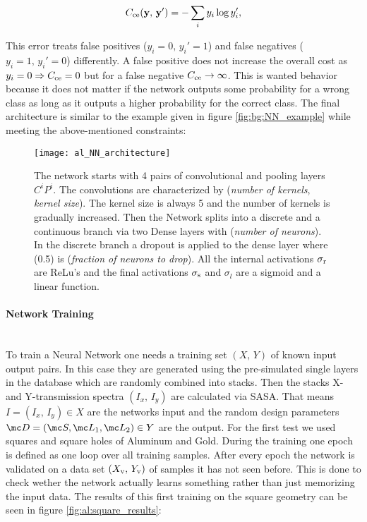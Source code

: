 \begin{equation}
    C_{\mathrm{ce}}(\vb y, \, \vb y') = - \sum_i y_i \log y'_i,
\end{equation}

\noindent
This error treats false positives ($y_i = 0, \, y_i' = 1$) and false negatives ($y_i = 1, \, y_i' = 0$) differently. A false positive does not increase the overall cost as $y_i = 0 \Rightarrow C_{\mathrm{ce}} = 0$ but for a false negative $C_{\mathrm{ce}} \rightarrow \infty$. This is wanted behavior because it does not matter if the network outputs some probability for a wrong class as long as it outputs a higher probability for the correct class. The final architecture is similar to the example given in figure \ref{fig:bg:NN_example} while meeting the above-mentioned constraints:

\begin{figure}[H]
    \centering
    \texttt{[image: al\_NN\_architecture]}
    \caption{The network starts with 4 pairs of convolutional and pooling layers $C^i P^i   $. The convolutions are characterized by (\textit{number of kernels}, \textit{kernel size}). The kernel size is always 5 and the number of kernels is gradually increased. Then the Network splits into a discrete and a continuous branch via two Dense layers with (\textit{number of neurons}). In the discrete branch a dropout is applied to the dense layer where (0.5) is (\textit{fraction of neurons to drop}).
    All the internal activations $\sigma_{\mathrm{r}}$ are ReLu's and the final activations $\sigma_{\mathrm{s}}$ and $\sigma_{l}$ are a sigmoid and a linear function.}
    \label{fig:al:NN_architecture}
\end{figure}

\newpage
\paragraph{Network Training}~\\
To train a Neural Network one needs a training set $(X, \, Y)$ of known input output pairs. In this case they are generated using the pre-simulated single layers in the database which are randomly combined into stacks. Then the stacks X- and Y-transmission spectra $(I_x, \, I_y)$ are calculated via SASA.
That means $I = (I_x, \, I_y) \in X$ are the networks input and the random design parameters ${\mc D = (\mc S, \mc L_1, \mc L_2) \in Y}$ are the output. For the first test we used squares and square holes of Aluminum and Gold. During the training one epoch is defined as one loop over all training samples. After every epoch the network is validated on a data set $(X_{\mathrm{v}}, \, Y_{\mathrm{v}})$ of samples it has not seen before. This is done to check wether the network actually learns something rather than just memorizing the input data.  The results of this first training on the square geometry can be seen in figure \ref{fig:al:square_results}:

